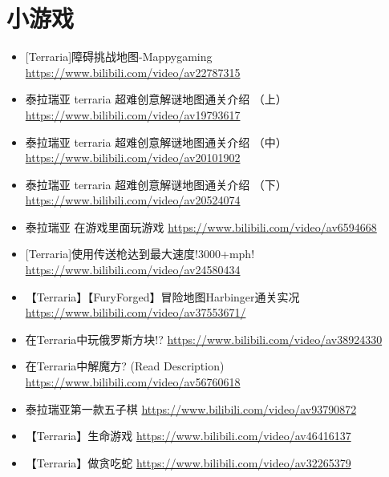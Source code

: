 \section{小游戏}
\begin{itemize}
\item {[}Terraria]障碍挑战地图-Mappygaming \url{https://www.bilibili.com/video/av22787315}
\item 泰拉瑞亚 terraria 超难创意解谜地图通关介绍 （上） \url{https://www.bilibili.com/video/av19793617}
\item 泰拉瑞亚 terraria 超难创意解谜地图通关介绍 （中） \url{https://www.bilibili.com/video/av20101902}
\item 泰拉瑞亚 terraria 超难创意解谜地图通关介绍 （下） \url{https://www.bilibili.com/video/av20524074}
\item 泰拉瑞亚 在游戏里面玩游戏 \url{https://www.bilibili.com/video/av6594668}
\item {[}Terraria]使用传送枪达到最大速度!3000+mph! \url{https://www.bilibili.com/video/av24580434}
\item【Terraria】【FuryForged】冒险地图Harbinger通关实况 \url{https://www.bilibili.com/video/av37553671/}
\item 在Terraria中玩俄罗斯方块!? \url{https://www.bilibili.com/video/av38924330}
\item 在Terraria中解魔方? (Read Description) \url{https://www.bilibili.com/video/av56760618}
\item 泰拉瑞亚第一款五子棋 \url{https://www.bilibili.com/video/av93790872}
\item 【Terraria】生命游戏 \url{https://www.bilibili.com/video/av46416137}
\item 【Terraria】做贪吃蛇 \url{https://www.bilibili.com/video/av32265379}
\end{itemize}

